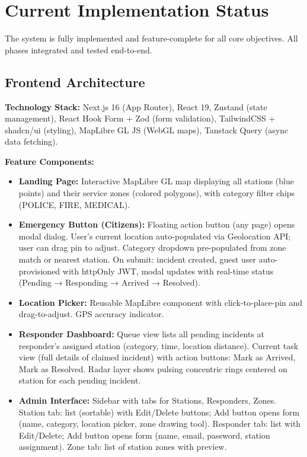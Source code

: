 \section{Current Implementation Status}

The system is fully implemented and feature-complete for all core objectives. All phases integrated and tested end-to-end.

\subsection{Frontend Architecture}

\textbf{Technology Stack:} Next.js 16 (App Router), React 19, Zustand (state management), React Hook Form + Zod (form validation), TailwindCSS + shadcn/ui (styling), MapLibre GL JS (WebGL maps), Tanstack Query (async data fetching).

\textbf{Feature Components:}
\begin{itemize}
  \item \textbf{Landing Page:} Interactive MapLibre GL map displaying all stations (blue points) and their service zones (colored polygons), with category filter chips (POLICE, FIRE, MEDICAL).
  \item \textbf{Emergency Button (Citizens):} Floating action button (any page) opens modal dialog. User's current location auto-populated via Geolocation API; user can drag pin to adjust. Category dropdown pre-populated from zone match or nearest station. On submit: incident created, guest user auto-provisioned with httpOnly JWT, modal updates with real-time status (Pending → Responding → Arrived → Resolved).
  \item \textbf{Location Picker:} Reusable MapLibre component with click-to-place-pin and drag-to-adjust. GPS accuracy indicator.
  \item \textbf{Responder Dashboard:} Queue view lists all pending incidents at responder's assigned station (category, time, location distance). Current task view (full details of claimed incident) with action buttons: Mark as Arrived, Mark as Resolved. Radar layer shows pulsing concentric rings centered on station for each pending incident.
  \item \textbf{Admin Interface:} Sidebar with tabs for Stations, Responders, Zones. Station tab: list (sortable) with Edit/Delete buttons; Add button opens form (name, category, location picker, zone drawing tool). Responder tab: list with Edit/Delete; Add button opens form (name, email, password, station assignment). Zone tab: list of station zones with preview.
\end{itemize}

